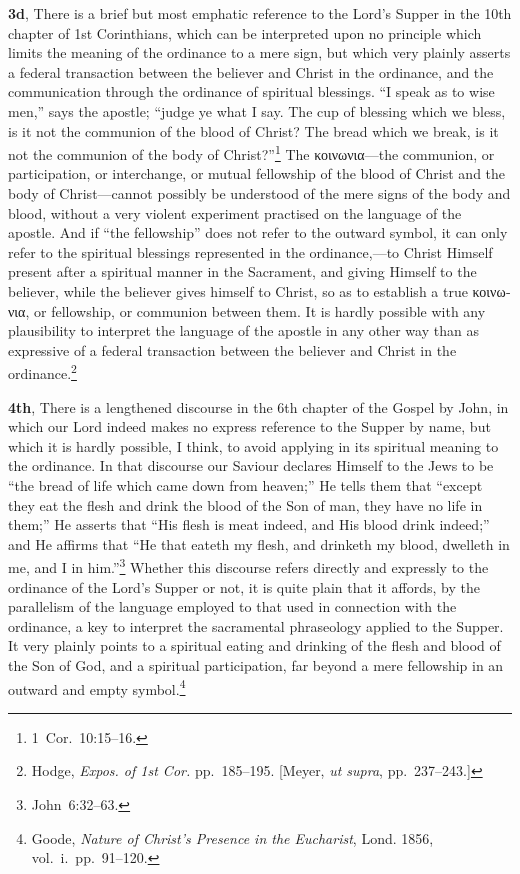 \documentclass[
  english,
]{book}
\newcommand{\textgreek}[2][]{\foreignlanguage{greek}{#2}}
\begin{document}
\textbf{3d}, There is a brief but most emphatic reference to the Lord's Supper in the 10th chapter of 1st Corinthians, which can be interpreted upon no principle which limits the meaning of the ordinance to a mere sign, but which very plainly asserts a federal transaction between the believer and Christ in the ordinance, and the communication through the ordinance of spiritual blessings. ``I speak as to wise men,'' says the apostle; ``judge ye what I say. The cup of blessing which we bless, is it not the communion of the blood of Christ? The bread which we break, is it not the communion of the body of Christ?''\footnote{1~Cor.~10:15--16.} The \textgreek{κοινωνια}---the communion, or participation, or interchange, or mutual fellowship of the blood of Christ and the body of Christ---cannot possibly be understood of the mere signs of the body and blood, without a very violent experiment practised on the language of the apostle. And if ``the fellowship'' does not refer to the outward symbol, it can only refer to the spiritual blessings represented in the ordinance,---to Christ Himself present after a spiritual manner in the Sacrament, and giving Himself to the believer, while the believer gives himself to Christ, so as to establish a true \textgreek{κοινωνια}, or fellowship, or communion between them. It is hardly possible with any plausibility to interpret the language of the apostle in any other way than as expressive of a federal transaction between the believer and Christ in the ordinance.\footnote{Hodge, \emph{Expos. of 1st Cor.} pp.~185--195. {[}Meyer, \emph{ut supra}, pp.~237--243.{]}}

\textbf{4th}, There is a lengthened discourse in the 6th chapter of the Gospel by John, in which our Lord indeed makes no express reference to the Supper by name, but which it is hardly possible, I think, to avoid applying in its spiritual meaning to the ordinance. In that discourse our Saviour declares Himself to the Jews to be ``the bread of life which came down from heaven;'' He tells them that ``except they eat the flesh and drink the blood of the Son of man, they have no life in them;'' He asserts that ``His flesh is meat indeed, and His blood drink indeed;'' and He affirms that ``He that eateth my flesh, and drinketh my blood, dwelleth in me, and I in him.''\footnote{John~6:32--63.} Whether this discourse refers directly and expressly to the ordinance of the Lord's Supper or not, it is quite plain that it affords, by the parallelism of the language employed to that used in connection with the ordinance, a key to interpret the sacramental phraseology applied to the Supper. It very plainly points to a spiritual eating and drinking of the flesh and blood of the Son of God, and a spiritual participation, far beyond a mere fellowship in an outward and empty symbol.\footnote{Goode, \emph{Nature of Christ's Presence in the Eucharist}, Lond. 1856, vol.~i.~pp.~91--120.}
\end{document}
